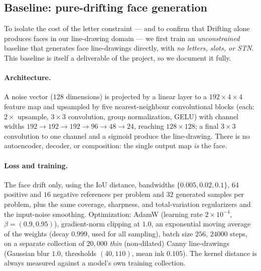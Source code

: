 \documentclass{article}
\begin{document}
\subsection{Baseline: pure-drifting face generation}
\label{sec:baseline}
To isolate the cost of the letter constraint --- and to confirm that Drifting alone produces faces in
our line-drawing domain --- we first train an \emph{unconstrained} baseline that generates face
line-drawings directly, with \emph{no letters, slots, or STN}. This baseline is itself a deliverable of
the project, so we document it fully.

\paragraph{Architecture.} A noise vector ($128$ dimensions) is projected by a linear layer to a
$192{\times}4{\times}4$ feature map and upsampled by five nearest-neighbour convolutional blocks (each:
$2\times$ upsample, $3{\times}3$ convolution, group normalization, GELU) with channel widths
$192\to192\to192\to96\to48\to24$, reaching $128{\times}128$; a final $3{\times}3$ convolution to one
channel and a sigmoid produce the line-drawing. There is no autoencoder, decoder, or composition: the
single output map \emph{is} the face.

\paragraph{Loss and training.} The face drift only, using the IoU distance, bandwidths
$\{0.005,0.02,0.1\}$, $64$ positive and $16$ negative references per problem and $32$ generated samples
per problem, plus the same coverage, sharpness, and total-variation regularizers and the input-noise
smoothing. Optimization: AdamW (learning rate $2{\times}10^{-4}$, $\beta=(0.9,0.95)$), gradient-norm
clipping at $1.0$, an exponential moving average of the weights (decay $0.999$, used for all sampling),
batch size $256$, $24000$ steps, on a separate collection of $20{,}000$ \emph{thin} (non-dilated) Canny
line-drawings (Gaussian blur $1.0$, thresholds $(40,110)$, mean ink $0.105$). The kernel distance is
always measured against a model's own training collection.
\end{document}
